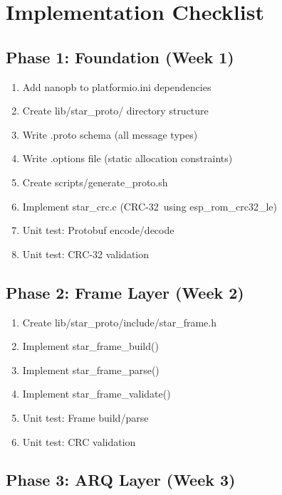 \documentclass[12pt,letterpaper]{article}
\newcommand{\checkbox}{\raisebox{0.5pt}{\tikz{\draw (0,0) rectangle (0.3,0.3);}}}
\begin{document}
\section{Implementation Checklist}

\subsection{Phase 1: Foundation (Week 1)}

\begin{enumerate}[label=\protect\checkbox]
    \item Add nanopb to platformio.ini dependencies
    \item Create lib/star\_proto/ directory structure
    \item Write .proto schema (all message types)
    \item Write .options file (static allocation constraints)
    \item Create scripts/generate\_proto.sh
    \item Implement star\_crc.c (CRC-32~using esp\_rom\_crc32\_le)
    \item Unit test: Protobuf encode/decode
    \item Unit test: CRC-32 validation
\end{enumerate}

\subsection{Phase 2: Frame Layer (Week 2)}

\begin{enumerate}[label=\protect\checkbox]
    \item Create lib/star\_proto/include/star\_frame.h
    \item Implement star\_frame\_build()
    \item Implement star\_frame\_parse()
    \item Implement star\_frame\_validate()
    \item Unit test: Frame build/parse
    \item Unit test: CRC validation
\end{enumerate}

\subsection{Phase 3: ARQ Layer (Week 3)}
\end{document}

